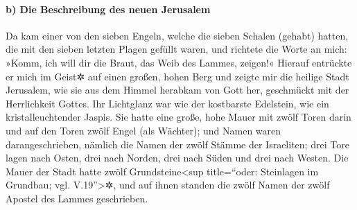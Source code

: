 \hypertarget{b-die-beschreibung-des-neuen-jerusalem}{%
\paragraph{b) Die Beschreibung des neuen
Jerusalem}\label{b-die-beschreibung-des-neuen-jerusalem}}

 Da kam einer von den sieben Engeln, welche die sieben
Schalen (gehabt) hatten, die mit den sieben letzten Plagen gefüllt
waren, und richtete die Worte an mich: »Komm, ich will dir die Braut,
das Weib des Lammes, zeigen!«  Hierauf entrückte er mich
im Geist✲ auf einen großen, hohen Berg und zeigte mir die heilige Stadt
Jerusalem, wie sie aus dem Himmel herabkam von Gott her, 
geschmückt mit der Herrlichkeit Gottes. Ihr Lichtglanz war wie der
kostbarste Edelstein, wie ein kristalleuchtender Jaspis. 
Sie hatte eine große, hohe Mauer mit zwölf Toren darin und auf den Toren
zwölf Engel (als Wächter); und Namen waren darangeschrieben, nämlich die
Namen der zwölf Stämme der Israeliten;  drei Tore lagen
nach Osten, drei nach Norden, drei nach Süden und drei nach Westen.
 Die Mauer der Stadt hatte zwölf Grundsteine\textless sup
title=``oder: Steinlagen im Grundbau; vgl. V.19''\textgreater✲, und auf
ihnen standen die zwölf Namen der zwölf Apostel des Lammes geschrieben.

